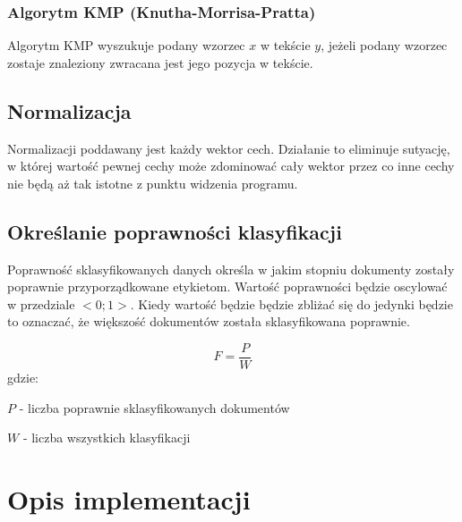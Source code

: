 \documentclass{classrep}
\begin{document}
\subsubsection{Algorytm KMP (Knutha-Morrisa-Pratta)}
Algorytm KMP wyszukuje podany wzorzec $x$ w tekście $y$, jeżeli podany wzorzec zostaje znaleziony zwracana jest jego
pozycja w tekście.

\subsection{Normalizacja}
Normalizacji poddawany jest każdy wektor cech. Działanie to eliminuje sutyację, w której wartość pewnej
cechy może zdominować cały wektor przez co inne cechy nie będą aż tak istotne z punktu widzenia programu.

\subsection{Określanie poprawności klasyfikacji} \label{poprawnosc_klasyfikacji}
Poprawność sklasyfikowanych danych określa w jakim stopniu dokumenty zostały poprawnie przyporządkowane etykietom.
Wartość poprawności będzie oscylować w przedziale $<0;1>$. Kiedy wartość będzie będzie zbliżać się do jedynki będzie
to oznaczać, że większość dokumentów została sklasyfikowana poprawnie.

\begin{equation}
    F=\frac{P}{W}
\end{equation}
gdzie:\\
\begin{description}
    \item $P$ - liczba poprawnie sklasyfikowanych dokumentów
    \item $W$ - liczba wszystkich klasyfikacji
\end{description}


\section{Opis implementacji}
\end{document}
